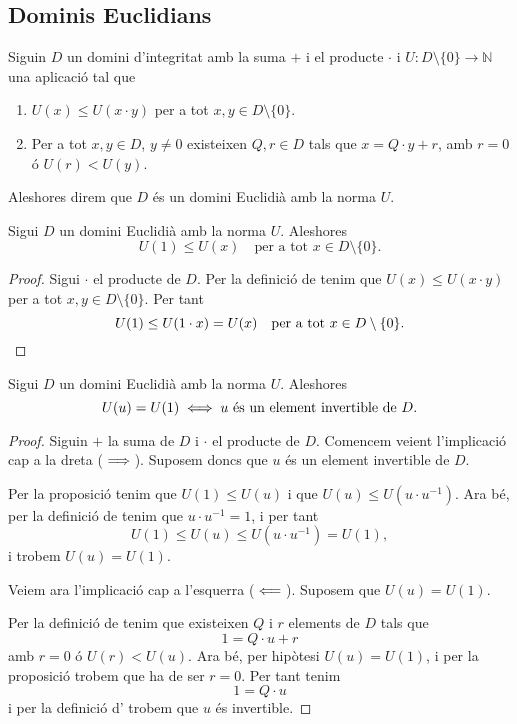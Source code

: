\documentclass[../../Main.tex]{subfiles}
\begin{document}
	\subsection{Dominis Euclidians}
	\begin{definition}
		\label{def:domini Euclidià}
		\label{def:DE}
		Siguin \(D\) un domini d'integritat amb la suma \(+\) i el producte \(\cdot\) i \(U\colon D\setminus\{0\}\longrightarrow\mathbb{N}\) una aplicació tal que
		\begin{enumerate}
			\item \(U(x)\leq U(x\cdot y)\) per a tot \(x,y\in D\setminus\{0\}\).
			\item Per a tot \(x,y\in D\), \(y\neq0\) existeixen \(Q,r\in D\) tals que \(x=Q\cdot y+r\), amb \(r=0\) ó \(U(r)<U(y)\).
		\end{enumerate}
		Aleshores direm que \(D\) és un domini Euclidià amb la norma \(U\).
	\end{definition}
	\begin{proposition}
		\label{prop:norma de 1 és la més petita en DE}
		Sigui \(D\) un domini Euclidià amb la norma \(U\). Aleshores
		\[U(1)\leq U(x)\quad\text{per a tot }x\in D\setminus\{0\}.\]
		\begin{proof}
			Sigui \(\cdot\) el producte de \(D\). Per la definició de  tenim que \(U(x)\leq U(x\cdot y)\) per a tot \(x,y\in D\setminus\{0\}\). Per tant
			\[U(1)\leq U(1\cdot x)=U(x)\quad\text{per a tot }x\in D\setminus\{0\}.\qedhere\]
		\end{proof}
	\end{proposition}
	\begin{proposition}
		Sigui \(D\) un domini Euclidià amb la norma \(U\). Aleshores
		\[U(u)=U(1)\iff u\text{ és un element invertible de }D.\]
		\begin{proof}			
			Siguin \(+\) la suma de \(D\) i \(\cdot\) el producte de \(D\). Comencem veient l'implicació cap a la dreta (\(\implies\)). Suposem doncs que \(u\) és un element invertible de \(D\).
			
			Per la proposició  tenim que \(U(1)\leq U(u)\) i que \(U(u)\leq U(u\cdot u^{-1})\). Ara bé, per la definició de  tenim que \(u\cdot u^{-1}=1\), i per tant
			\[U(1)\leq U(u)\leq U(u\cdot u^{-1})=U(1),\]
			i trobem \(U(u)=U(1)\).
			
			Veiem ara l'implicació cap a l'esquerra (\(\impliedby\)). Suposem que \(U(u)=U(1)\).
			
			Per la definició de  tenim que existeixen \(Q\) i \(r\) elements de \(D\) tals que
			\[1=Q\cdot u+r\]
			amb \(r=0\) ó \(U(r)<U(u)\). Ara bé, per hipòtesi \(U(u)=U(1)\), i per la proposició  trobem que ha de ser \(r=0\). Per tant tenim
			\[1=Q\cdot u\]
			i per la definició d' trobem que \(u\) és invertible.
		\end{proof}
	\end{proposition}
\end{document}
